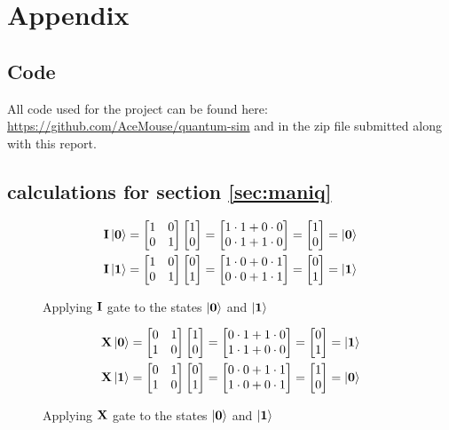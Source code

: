 \section{Appendix}
\subsection{Code}
All code used for the project can be found here: \url{https://github.com/AceMouse/quantum-sim} and in the zip file submitted along with this report.
\subsection{calculations for section \ref{sec:maniq}} \label{app:maniq}
\begin{figure}[H]
    \centering
    \begin{align*}
        \mathbf{I}\ket{\mathbf{0}}&=\begin{bmatrix} 1 & 0\\ 0 & 1\\ \end{bmatrix}\begin{bmatrix} 1\\ 0\\ \end{bmatrix}=
        \begin{bmatrix}
            1 \cdot 1 + 0 \cdot 0\\
            0 \cdot 1 + 1 \cdot 0\\
        \end{bmatrix}=
        \begin{bmatrix} 1\\ 0\\ \end{bmatrix}=\ket{\mathbf{0}}\\
        \mathbf{I}\ket{\mathbf{1}}&=\begin{bmatrix} 1 & 0\\ 0 & 1\\ \end{bmatrix}\begin{bmatrix} 0\\ 1\\ \end{bmatrix}=
        \begin{bmatrix}
            1 \cdot 0 + 0 \cdot 1\\
            0 \cdot 0 + 1 \cdot 1\\
        \end{bmatrix}=
        \begin{bmatrix} 0\\ 1\\ \end{bmatrix}=\ket{\mathbf{1}}
    \end{align*}
    \caption{Applying $\mathbf{I}$ gate to the states $\ket{\mathbf{0}}$ and $\ket{\mathbf{1}}$}
    \label{fig:app_i}
\end{figure}

\begin{figure}[H]
    \centering
    \begin{align*}
        \mathbf{X}\ket{\mathbf{0}}&=\begin{bmatrix} 0 & 1\\ 1 & 0\\ \end{bmatrix}\begin{bmatrix} 1\\ 0\\ \end{bmatrix}=
        \begin{bmatrix}
            0 \cdot 1 + 1 \cdot 0\\
            1 \cdot 1 + 0 \cdot 0\\
        \end{bmatrix}=
        \begin{bmatrix} 0\\ 1\\ \end{bmatrix}=\ket{\mathbf{1}}\\
        \mathbf{X}\ket{\mathbf{1}}&=\begin{bmatrix} 0 & 1\\ 1 & 0\\ \end{bmatrix}\begin{bmatrix} 0\\ 1\\ \end{bmatrix}=
        \begin{bmatrix}
            0 \cdot 0 + 1 \cdot 1\\
            1 \cdot 0 + 0 \cdot 1\\
        \end{bmatrix}=
        \begin{bmatrix} 1\\ 0\\ \end{bmatrix}=\ket{\mathbf{0}}
    \end{align*}
    \caption{Applying $\mathbf{X}$ gate to the states $\ket{\mathbf{0}}$ and $\ket{\mathbf{1}}$}
    \label{fig:app_x}
\end{figure}

